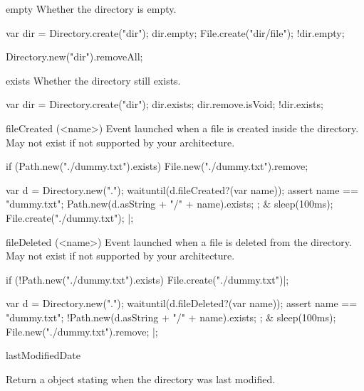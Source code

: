 \begin{urbiscriptapi}
\item[empty]
  Whether the directory is empty.
\begin{urbiassert}
var dir = Directory.create("dir");
dir.empty;
File.create("dir/file");
!dir.empty;
\end{urbiassert}
\begin{urbicomment}
Directory.new("dir").removeAll;
\end{urbicomment}


\item[exists]
  Whether the directory still exists.
\begin{urbiassert}
var dir = Directory.create("dir");
dir.exists;
dir.remove.isVoid;
!dir.exists;
\end{urbiassert}


\item[fileCreated](<name>)%
  Event launched when a file is created inside the directory.
  May not exist if not supported by your architecture.

\begin{urbiscript}[firstnumber=1]
if (Path.new("./dummy.txt").exists)
  File.new("./dummy.txt").remove;

  {
    var d = Directory.new(".");
    waituntil(d.fileCreated?(var name));
    assert
    {
      name == "dummy.txt";
      Path.new(d.asString + "/" + name).exists;
    };
  }
&
  {
    sleep(100ms);
    File.create("./dummy.txt");
  }|;
\end{urbiscript}


\item[fileDeleted](<name>)%
  Event launched when a file is deleted from the directory.  May not exist
  if not supported by your architecture.
\begin{urbiscript}[firstnumber=1]
if (!Path.new("./dummy.txt").exists)
  File.create("./dummy.txt")|;

  {
    var d = Directory.new(".");
    waituntil(d.fileDeleted?(var name));
    assert
    {
      name == "dummy.txt";
      !Path.new(d.asString + "/" + name).exists;
    };
  }
&
  {
    sleep(100ms);
    File.new("./dummy.txt").remove;
  }|;
\end{urbiscript}


\item[lastModifiedDate]
  \experimental{}

  Return a  object stating when the directory was last
  modified.



\end{urbiscriptapi}
